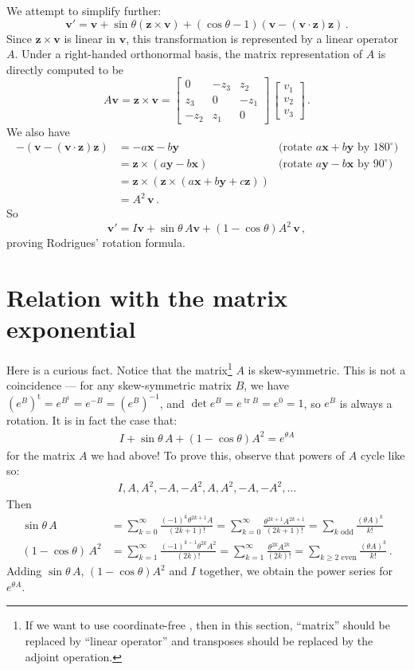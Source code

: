 \documentclass[12pt]{article}
\newcommand{\bx}{\mathbf{x}}
\newcommand{\by}{\mathbf{y}}
\newcommand{\bz}{\mathbf{z}}
\newcommand{\bv}{\mathbf{v}}
\providecommand{\transpose}[1]{{#1}^{\textrm{t}}}
\DeclareMathOperator{\trace}{tr}
\begin{document}
We attempt to simplify further:
\[
\bv' = \bv + \sin\theta (\bz \times \bv) + (\cos \theta - 1)(\bv - (\bv \cdot \bz)\bz )\,.
\]
Since $\bz \times \bv$ is linear in $\bv$, this transformation is represented by
a linear operator $A$. Under a right-handed orthonormal basis,
the matrix representation of $A$ is directly computed to be
\[
A\bv = \bz \times \bv
= \begin{bmatrix} 
0 & -z_3 & z_2 \\ 
z_3 & 0 & -z_1 \\
-z_2 & z_1 & 0
\end{bmatrix}
\,
\begin{bmatrix}
v_1 \\
v_2 \\
v_3
\end{bmatrix}
\,.
\]
We also have
\begin{align*}
-(\bv - (\bv \cdot \bz) \bz) &= -a\bx - b\by &
\text{(rotate $a\bx + b\by$ by $180^\circ$)} \\
&= \bz \times (a\by - b\bx) &
\text{(rotate $a\by - b\bx$ by $90^\circ$)} 
\\
&= \bz \times (\bz \times (a\bx + b\by +c\bz)) \\ 
&= A^2 \, \bv\,.
\end{align*}
So
\[
\bv' = I\bv + \sin \theta \, A\bv + (1- \cos\theta) A^2 \, \bv\,,
\]
proving Rodrigues' rotation formula.

\section*{Relation with the matrix exponential}
Here is a curious fact. Notice that the matrix\footnote{If we want to use coordinate-free , then in this section, ``matrix'' should be replaced by ``linear operator'' and transposes should be replaced by the adjoint operation.} $A$ is skew-symmetric.
This is not a coincidence --- for any skew-symmetric matrix $B$, we have 
$\transpose{(e^B)} = e^{\transpose{B}} = e^{-B} = (e^B)^{-1}$, 
and $\det e^B = e^{\trace B} = e^0 = 1$,
so $e^B$ is always a rotation.  It is in fact the case that:
\begin{align*}
I + \sin \theta \, A + (1- \cos\theta) A^2 = e^{\theta A}
\end{align*}
for the matrix $A$ we had above! To prove this, observe that powers of $A$ cycle like so:
\begin{align*}
I, A, A^2, -A, -A^2, A, A^2, -A, -A^2, \dotsc
\end{align*}
Then 
\begin{align*}
\sin \theta \, A &= \sum_{k=0}^\infty \frac{(-1)^k \theta^{2k+1} A}{(2k+1)!} 
= \sum_{k=0}^\infty \frac{\theta^{2k+1} A^{2k+1}}{(2k+1)!} = \sum_{k \textrm{ odd}} \frac{(\theta A)^k}{k!}
\\
(1 - \cos \theta) \, A^2 &= \sum_{k=1}^\infty \frac{(-1)^{k-1} \theta^{2k} A^2}{(2k)!}
= \sum_{k=1}^\infty \frac{\theta^{2k} A^{2k}}{(2k)!} = \sum_{k\geq 2 \textrm{ even}} 
\frac{(\theta A)^k}{k!}\,.
\end{align*}
Adding $\sin \theta \, A$, $(1-\cos \theta) A^2$ and $I$ together, we obtain the power series
for $e^{\theta A}$.
\end{document}
